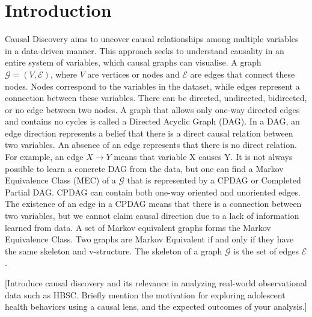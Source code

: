 \section{Introduction}
Causal Discovery aims to uncover causal relationships among multiple variables in a data-driven manner. This approach seeks to understand causality in an entire system of variables, which causal graphs can visualise. A graph $\mathcal{G} = (V, \mathcal{E})$, where $V$ are vertices or nodes and $\mathcal{E}$ are edges that connect these nodes. Nodes correspond to the variables in the dataset, while edges represent a connection between these variables. There can be directed, undirected, bidirected, or no edge between two nodes. A graph that allows only one-way directed edges and contains no cycles is called a Directed Acyclic Graph (DAG). In a DAG, an edge direction represents a belief that there is a direct causal relation between two variables. An absence of an edge represents that there is no direct relation. For example, an edge $X \rightarrow Y$ means that variable X causes Y. It is not always possible to learn a concrete DAG from the data, but one can find a Markov Equivalence Class (MEC) of a $\mathcal{G}$ that is represented by a CPDAG or Completed Partial DAG. CPDAG can contain both one-way oriented and unoriented edges. The existence of an edge in a CPDAG means that there is a connection between two variables, but we cannot claim causal direction due to a lack of information learned from data. A set of Markov equivalent graphs forms the Markov Equivalence Class. Two graphs are Markov Equivalent if and only if they have the same skeleton and v-structure. The skeleton of a graph $\mathcal{G}$ is the set of edges $\mathcal{E}$.

[Introduce causal discovery and its relevance in analyzing real-world observational data such as HBSC. Briefly mention the motivation for exploring adolescent health behaviors using a causal lens, and the expected outcomes of your analysis.]
